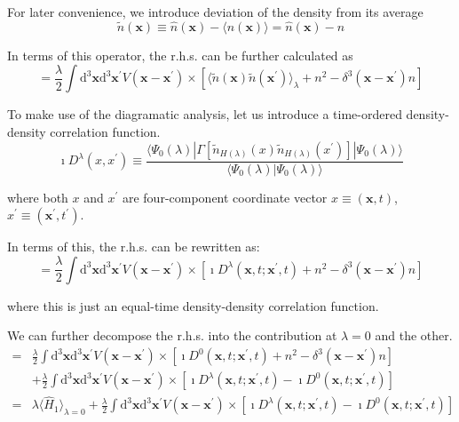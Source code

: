 For later convenience, we introduce deviation of the density from its average
\[ \tilde{n}(\mathbf{x})\equiv \hat{n}(\mathbf{x}) - \langle \hat{n}(\mathbf{x}) \rangle = \hat{n}(\mathbf{x})-n \]

In terms of this operator, the r.h.s. can be further calculated as
\[= \frac{\lambda}{2}\int \mathrm{d}^3\mathbf{x}\mathrm{d}^3\mathbf{x}^{'}
V(\mathbf{x}-\mathbf{x}^{'})\times \left[ \langle \tilde{n}(\mathbf{x})\tilde{n}(\mathbf{x}^{'}) \rangle_{\lambda} + n^2-\delta^3(\mathbf{x}-\mathbf{x}^{'}) n \right]
\]

To make use of the diagramatic analysis, let us introduce a time-ordered density-density correlation function.
\begin{equation} \label{Eqs2.8.2}
\imath D^\lambda(x,x^{'}) \equiv \frac{\langle \Psi_0(\lambda)|\Gamma[\tilde{n}_{H(\lambda)}(x)\tilde{n}_{H(\lambda)}(x^{'})]|\Psi_0(\lambda) \rangle}{\langle \Psi_0(\lambda)|\Psi_0(\lambda) \rangle}
\end{equation}

where both $x$ and $x^{'}$ are four-component coordinate vector $x\equiv(\mathbf{x},t)$, $x^{'}\equiv(\mathbf{x}^{'},t^{'})$.

In terms of this, the r.h.s. can be rewritten as:
\[= \frac{\lambda}{2}\int \mathrm{d}^3\mathbf{x}\mathrm{d}^3\mathbf{x}^{'}
V(\mathbf{x}-\mathbf{x}^{'})\times \left[ \imath D^\lambda(\mathbf{x},t;\mathbf{x}^{'},t) + n^2-\delta^3(\mathbf{x}-\mathbf{x}^{'}) n \right]
\]

where this is just an equal-time density-density correlation function.

We can further decompose the r.h.s. into the contribution at $\lambda=0$ and the other.
\[ \begin{split}=& \frac{\lambda}{2}\int \mathrm{d}^3\mathbf{x}\mathrm{d}^3\mathbf{x}^{'}
V(\mathbf{x}-\mathbf{x}^{'})\times \left[ \imath D^0(\mathbf{x},t;\mathbf{x}^{'},t) + n^2-\delta^3(\mathbf{x}-\mathbf{x}^{'}) n \right]\\
&+\frac{\lambda}{2}\int \mathrm{d}^3\mathbf{x}\mathrm{d}^3\mathbf{x}^{'}
V(\mathbf{x}-\mathbf{x}^{'})\times \left[ \imath D^\lambda(\mathbf{x},t;\mathbf{x}^{'},t) -  \imath D^0(\mathbf{x},t;\mathbf{x}^{'},t) \right]\\
=& \lambda \langle \hat{H}_1 \rangle_{\lambda=0} + \frac{\lambda}{2}\int \mathrm{d}^3\mathbf{x}\mathrm{d}^3\mathbf{x}^{'}
V(\mathbf{x}-\mathbf{x}^{'})\times \left[ \imath D^\lambda(\mathbf{x},t;\mathbf{x}^{'},t) -  \imath D^0(\mathbf{x},t;\mathbf{x}^{'},t) \right]
\end{split}\]


